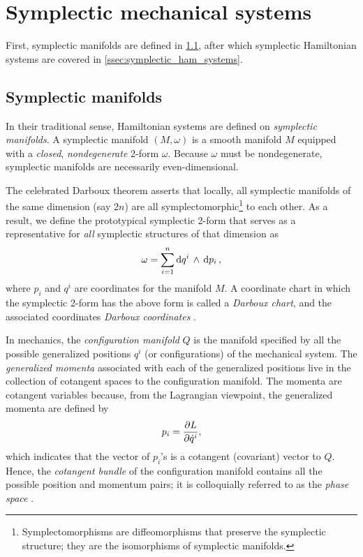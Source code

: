 \section{Symplectic mechanical systems}
\label{sec:symplectic}

First, symplectic manifolds are defined in \cref{ssec:symplectic_manifolds}, after which symplectic Hamiltonian systems are covered in \cref{ssec:symplectic_ham_systems}.

\subsection{Symplectic manifolds}
\label{ssec:symplectic_manifolds}
In their traditional sense, Hamiltonian systems are defined on \emph{symplectic manifolds}. A symplectic manifold \((M, \omega)\) is a smooth manifold \(M\) equipped with a \emph{closed}, \emph{nondegenerate} 2-form \(\omega\). Because \(\omega\) must be nondegenerate, symplectic manifolds are necessarily even-dimensional. 

The celebrated Darboux theorem asserts that locally, all symplectic manifolds of the same dimension (say \(2n\)) are all symplectomorphic\footnote{Symplectomorphisms are diffeomorphisms that preserve the symplectic structure; they are the isomorphisms of symplectic manifolds.} to each other. As a result, we define the prototypical symplectic 2-form that serves as a representative for \emph{all} symplectic structures of that dimension as
\begin{equation}
    \omega = \sum_{i = 1}^n  \dd{q^i}\,\wedge\,\dd{p_i} ,
    \label{eq:darboux_symplectic_form}
\end{equation}
where \(p_i\) and \(q^i\) are coordinates for the manifold \(M\). A coordinate chart in which the symplectic 2-form has the above form is called a \emph{Darboux chart}, and the associated coordinates \emph{Darboux coordinates} \cite{Cannas2001, Arnold1989}.

In mechanics, the \emph{configuration manifold} \(Q\) is the manifold specified by all the possible generalized positions \(q^i\) (or configurations) of the mechanical system. The \emph{generalized momenta} associated with each of the generalized positions live in the collection of cotangent spaces to the configuration manifold. The momenta are cotangent variables because, from the Lagrangian viewpoint, the generalized momenta are defined by
\begin{equation}
     p_i = \pdv{L}{\dot{q}^i},
\end{equation}
which indicates that the vector of \(p_i\)'s is a cotangent (covariant) vector to \(Q\). Hence, the \emph{cotangent bundle} of the configuration manifold contains all the possible position and momentum pairs; it is colloquially referred to as the \emph{phase space} \cite{Abraham1978,Arnold1989,Libermann1987}.

